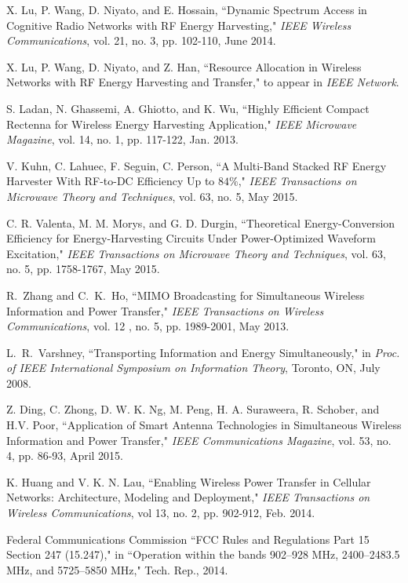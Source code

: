 \documentclass[twocolumn,10pt]{IEEEtran}
\begin{document}
\begin{thebibliography}{99}
X. Lu, P. Wang, D. Niyato, and E. Hossain, ``Dynamic Spectrum Access in Cognitive Radio Networks with RF Energy Harvesting," \emph{IEEE Wireless Communications}, vol. 21, no. 3, pp. 102-110, June 2014. 

X. Lu, P. Wang, D. Niyato, and Z. Han, ``Resource Allocation in Wireless Networks with RF Energy Harvesting and Transfer," to appear in \emph{IEEE Network}.




S. Ladan, N. Ghassemi, A. Ghiotto, and K. Wu, ``Highly Efficient Compact Rectenna for Wireless Energy Harvesting Application," \emph{IEEE Microwave Magazine},  vol. 14, no. 1,	pp. 117-122, Jan. 2013.

V. Kuhn, C. Lahuec, F. Seguin, C. Person, 
``A Multi-Band Stacked RF Energy Harvester With RF-to-DC Efficiency Up to $84\%$," \emph{IEEE Transactions on Microwave Theory and Techniques}, vol. 63, no. 5, May 2015. 

C. R. Valenta,  M. M. Morys, and G. D. Durgin, 
``Theoretical Energy-Conversion Efficiency for Energy-Harvesting Circuits Under Power-Optimized Waveform Excitation," 
\emph{IEEE Transactions on Microwave Theory and Techniques}, vol. 63, no. 5, pp. 1758-1767, May 2015.


R.~Zhang and C.~K.~Ho, ``MIMO Broadcasting for Simultaneous Wireless Information and Power Transfer," \emph{IEEE Transactions on Wireless Communications}, vol. 12 , no. 5, pp. 1989-2001, May 2013.

L.~R.~Varshney, ``Transporting Information and Energy Simultaneously," in {\em Proc. of IEEE International Symposium on Information Theory}, Toronto, ON, July 2008.

Z. Ding, C. Zhong, D. W. K. Ng, M. Peng,  H. A. Suraweera,  R. Schober, and H.V. Poor,   
``Application of Smart Antenna Technologies in Simultaneous Wireless Information and Power Transfer," \emph{IEEE Communications Magazine},  
vol. 53, no. 4, pp. 86-93, April  2015. 

K. Huang and V. K. N. Lau, ``Enabling Wireless Power Transfer in Cellular Networks: Architecture, Modeling and Deployment," \emph{IEEE Transactions on Wireless Communications}, vol 13, no. 2, pp. 902-912, Feb. 2014.


Federal Communications Commission ``FCC Rules and Regulations
Part 15 Section 247 (15.247)," in ``Operation within the bands 902–928
MHz, 2400–2483.5 MHz, and 5725–5850 MHz," Tech. Rep., 2014.


\end{thebibliography}
\end{document}
